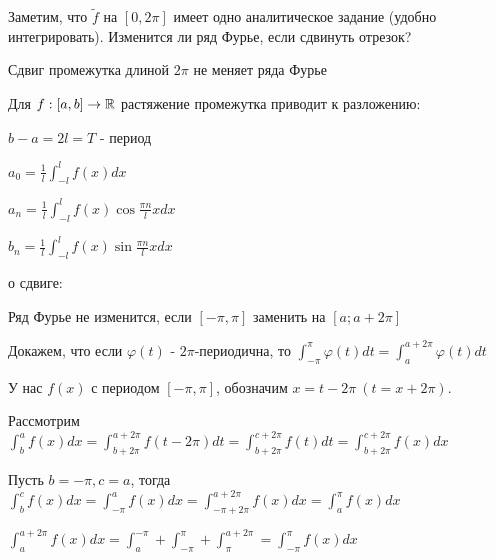 \documentclass[12pt]{article}
\begin{document}
    \mediumvspace

    Заметим, что $\tilde{f}$ на $[0, 2\pi]$ имеет одно аналитическое задание (удобно интегрировать). Изменится ли 
    ряд Фурье, если сдвинуть отрезок?

    \begin{MyTheorem}
         Сдвиг промежутка длиной $2\pi$ не меняет ряда Фурье
    \end{MyTheorem}

    \begin{MyTheorem}
         Для $f : [a, b] \to \mathbb{R}$ растяжение промежутка приводит к разложению:

        $b - a = 2l = T$ - период

        $a_0 = \frac{1}{l} \int_{-l}^l f(x) dx$

        $a_n = \frac{1}{l} \int_{-l}^l f(x) \cos \frac{\pi n}{l} x dx$

        $b_n = \frac{1}{l} \int_{-l}^l f(x) \sin \frac{\pi n}{l} x dx$
    \end{MyTheorem}






\begin{MyTheorem}
     о сдвиге:

    Ряд Фурье не изменится, если $[-\pi, \pi]$ заменить на $[a; a + 2\pi]$
\end{MyTheorem}

\begin{MyProof}
    Докажем, что если $\varphi(t)$ - $2\pi$-периодична, то $\int_{-\pi}^\pi \varphi(t) dt = \int_a^{a + 2\pi} \varphi(t) dt$

    У нас $f(x)$ с периодом $[-\pi, \pi]$, обозначим $x = t - 2\pi \ (t = x + 2\pi)$.

    Рассмотрим $\int_b^a f(x)dx = \int_{b + 2\pi}^{a + 2\pi} f(t - 2\pi) dt = \int_{b + 2\pi}^{c + 2\pi} f(t)dt = \int_{b + 2\pi}^{c + 2\pi} f(x)dx$

    Пусть $b = -\pi, c = a$, тогда $\int_b^c f(x)dx = \int_{-\pi}^a f(x)dx = \int_{-\pi + 2\pi}^{a + 2\pi} f(x)dx = \int_a^{\pi} f(x)dx$

    $\int_a^{a + 2\pi} f(x)dx = \int_a^{-\pi} + \int_{-\pi}^\pi + \int_\pi^{a + 2\pi} = \int_{-\pi}^{\pi} f(x)dx$

\end{MyProof}
\end{document}
